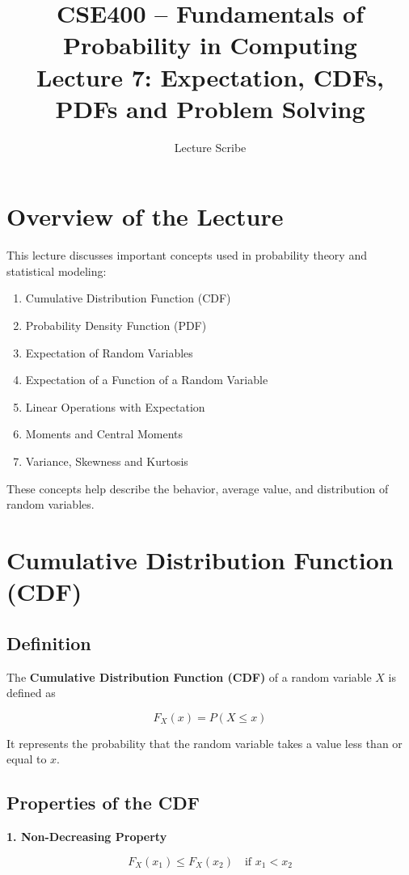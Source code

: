 \documentclass[12pt]{article}
\title{CSE400 -- Fundamentals of Probability in Computing\\
Lecture 7: Expectation, CDFs, PDFs and Problem Solving}
\author{Lecture Scribe}
\date{}
\begin{document}
\maketitle

\section{Overview of the Lecture}

This lecture discusses important concepts used in probability theory and statistical modeling:

\begin{enumerate}
\item Cumulative Distribution Function (CDF)
\item Probability Density Function (PDF)
\item Expectation of Random Variables
\item Expectation of a Function of a Random Variable
\item Linear Operations with Expectation
\item Moments and Central Moments
\item Variance, Skewness and Kurtosis
\end{enumerate}

These concepts help describe the behavior, average value, and distribution of random variables.

\section{Cumulative Distribution Function (CDF)}

\subsection{Definition}

The \textbf{Cumulative Distribution Function (CDF)} of a random variable $X$ is defined as

\[
F_X(x) = P(X \leq x)
\]

It represents the probability that the random variable takes a value less than or equal to $x$.

\subsection{Properties of the CDF}

\textbf{1. Non-Decreasing Property}

\[
F_X(x_1) \leq F_X(x_2) \quad \text{if } x_1 < x_2
\]
\end{document}
